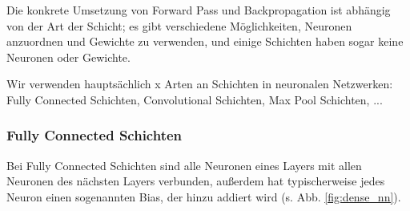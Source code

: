 \documentclass[10pt]{article}
\begin{document}
Die konkrete Umsetzung von Forward Pass und Backpropagation ist abhängig von der Art der Schicht; es gibt verschiedene Möglichkeiten, Neuronen anzuordnen und Gewichte zu verwenden, und einige Schichten haben sogar keine Neuronen oder Gewichte.

Wir verwenden hauptsächlich x %
Arten an Schichten in neuronalen Netzwerken: Fully Connected Schichten, Convolutional Schichten, Max Pool Schichten, ... %

\subsubsection{Fully Connected Schichten} 

Bei Fully Connected Schichten sind alle Neuronen eines Layers mit allen Neuronen des nächsten Layers verbunden, außerdem hat typischerweise jedes Neuron einen sogenannten Bias, der hinzu addiert wird (s. Abb. \ref{fig:dense_nn}).
\end{document}
